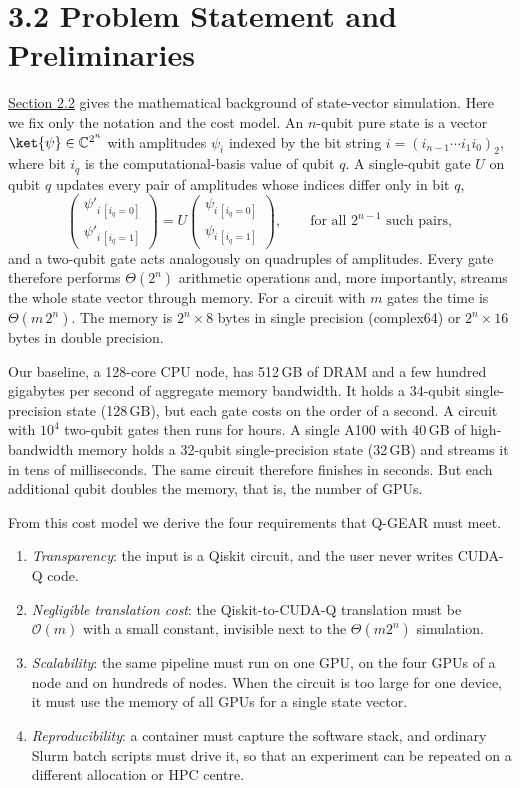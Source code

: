 \documentclass{report}
\theoremstyle{plain}
\theoremstyle{definition}
\theoremstyle{remark}
\newcommand{\bigO}[1]{\mathcal{O}\!\left(#1\right)}
\newcommand{\C}{\mathbb{C}}
\begin{document}
\section{3.2 Problem Statement and Preliminaries}\label{sec:qgear:problem}

\hyperref[sec:bg:sim]{Section 2.2} gives the mathematical background of state-vector simulation. Here we fix only the notation and the cost model. An $n$-qubit pure state is a vector $\ket{\psi}\in\C^{2^{n}}$ with amplitudes $\psi_{i}$ indexed by the bit string $i=(i_{n-1}\cdots i_{1}i_{0})_{2}$, where bit $i_{q}$ is the computational-basis value of qubit $q$. A single-qubit gate $U$ on qubit $q$ updates every pair of amplitudes whose indices differ only in bit $q$,
\hypertarget{eq:qgear:sqgate}{}\[
  \begin{pmatrix}\psi'_{i\,[i_{q}=0]}\\ \psi'_{i\,[i_{q}=1]}\end{pmatrix}
  = U \begin{pmatrix}\psi_{i\,[i_{q}=0]}\\ \psi_{i\,[i_{q}=1]}\end{pmatrix},
  \qquad \text{for all } 2^{n-1} \text{ such pairs},
\tag{3.1}\]
and a two-qubit gate acts analogously on quadruples of amplitudes. Every gate therefore performs $\Theta(2^{n})$ arithmetic operations and, more importantly, streams the whole state vector through memory. For a circuit with $m$ gates the time is $\Theta(m\,2^{n})$. The memory is $2^{n}\times 8$ bytes in single precision (complex64) or $2^{n}\times 16$ bytes in double precision.

Our baseline, a 128-core CPU node, has 512 GB of DRAM and a few hundred gigabytes per second of aggregate memory bandwidth. It holds a 34-qubit single-precision state (128 GB), but each gate costs on the order of a second. A circuit with $10^{4}$ two-qubit gates then runs for hours. A single A100 with 40 GB of high-bandwidth memory holds a 32-qubit single-precision state (32 GB) and streams it in tens of milliseconds. The same circuit therefore finishes in seconds. But each additional qubit doubles the memory, that is, the number of GPUs.

From this cost model we derive the four requirements that Q-GEAR must meet.
\begin{enumerate}
  \item \emph{Transparency}: the input is a Qiskit circuit, and the user never writes CUDA-Q code.
  \item \emph{Negligible translation cost}: the Qiskit-to-CUDA-Q translation must be $\bigO{m}$ with a small constant, invisible next to the $\Theta(m 2^{n})$ simulation.
  \item \emph{Scalability}: the same pipeline must run on one GPU, on the four GPUs of a node and on hundreds of nodes. When the circuit is too large for one device, it must use the memory of all GPUs for a single state vector.
  \item \emph{Reproducibility}: a container must capture the software stack, and ordinary Slurm batch scripts must drive it, so that an experiment can be repeated on a different allocation or HPC centre.
\end{enumerate}
\end{document}
